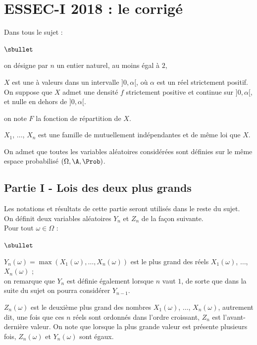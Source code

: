 \chapter*{ESSEC-I 2018 : le corrigé}
  
%

\noindent
Dans tous le sujet :
\begin{noliste}{$\sbullet$}
\item on désigne par $n$ un entier naturel, au moins égal à $2$,
  
\item $X$ est une \var à valeurs dans un intervalle $]0,\alpha[$, où
  $\alpha$ est un réel strictement positif. On suppose que $X$ admet
  une densité $f$ strictement positive et continue sur $]0,\alpha[$,
  et nulle en dehors de $]0,\alpha[$.
  
\item on note $F$ la fonction de répartition de $X$.
  
\item $X_1$, $\ldots$, $X_n$ est une famille de \var mutuellement
  indépendantes et de même loi que $X$.
\end{noliste}
On admet que toutes les variables aléatoires considérées sont définies
sur le même espace probabilisé $(\Omega, \A, \Prob)$.


\section*{Partie I - Lois des deux plus grands}

\noindent
Les notations et résultats de cette partie seront utilisés dans le reste
du sujet.\\
On définit deux variables aléatoires $Y_n$ et $Z_n$ de la façon 
suivante.\\
Pour tout $\omega \in \Omega$ :
\begin{noliste}{$\sbullet$}
  \item $Y_n(\omega) = \max(X_1(\omega), \ldots, X_n(\omega))$ est le 
  plus grand des réels $X_1(\omega)$, $\ldots$, $X_n(\omega)$ ;\\
  on remarque que $Y_n$ est définie également lorsque $n$ vaut $1$, de 
  sorte que dans la suite du sujet on pourra considérer $Y_{n-1}$.
  
  \item $Z_n(\omega)$ est le \og deuxième plus grand \fg{} des nombres 
  $X_1(\omega)$, $\ldots$, $X_n(\omega)$, autrement dit, une fois que 
  ces $n$ réels sont ordonnés dans l'ordre croissant, $Z_n$ est 
  l'avant-dernière valeur. On note que lorsque la plus grande valeur 
  est présente plusieurs fois, $Z_n(\omega)$ et $Y_n(\omega)$ sont 
  égaux.
\end{noliste}

